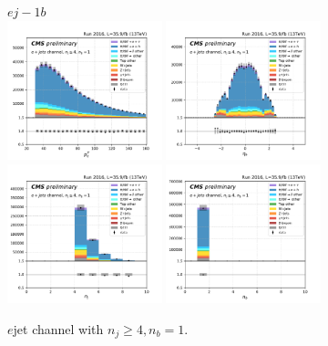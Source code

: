 \begin{figure}[ht]
    \centering
    $e j- 1b$ \\
    \includegraphics[width=0.4\textwidth]{chapters/Analysis/sectionPlots/figures/kinematics_pickles/e4j/1b/e4j_1b_lepton1_pt.pdf}
    \includegraphics[width=0.4\textwidth]{chapters/Analysis/sectionPlots/figures/kinematics_pickles/e4j/1b/e4j_1b_lepton1_eta.pdf}
    \includegraphics[width=0.4\textwidth]{chapters/Analysis/sectionPlots/figures/kinematics_pickles/e4j/1b/e4j_1b_nJets.pdf}
    \includegraphics[width=0.4\textwidth]{chapters/Analysis/sectionPlots/figures/kinematics_pickles/e4j/1b/e4j_1b_nBJets.pdf}
    
    \caption{$e$jet channel with $n_j\geq4, n_b=1$.}
\end{figure}

